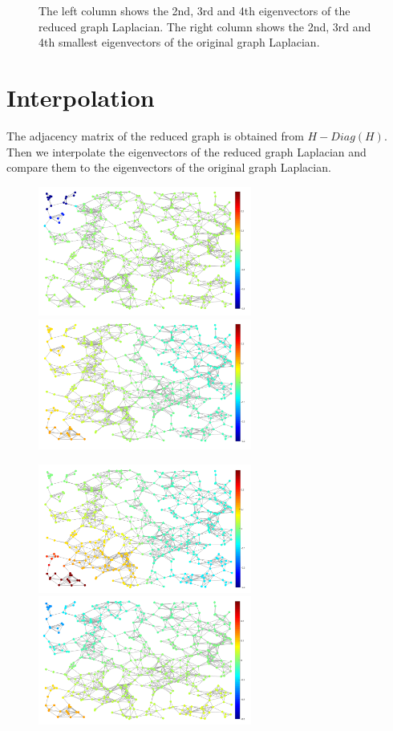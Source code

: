 \documentclass[a4paper]{article}
\begin{document}
\begin{figure}[H]
\caption{The left column shows the 2nd, 3rd and 4th eigenvectors of the reduced graph Laplacian. The right column shows the 2nd, 3rd and 4th smallest eigenvectors of the original graph Laplacian.}

\end{figure}

\section{Interpolation}

The adjacency matrix of the reduced graph is obtained from $H-Diag(H)$. Then we interpolate the eigenvectors of the reduced graph Laplacian and compare them to the eigenvectors of the original graph Laplacian.

\begin{figure}[H]
\centering
\includegraphics[width = 7cm]{interpolation/interpolate_2nd_eigen}
\includegraphics[width = 7cm]{interpolation/original_2nd_eigen}

\includegraphics[width = 7cm]{interpolation/interpolate_3rd_eigen}
\includegraphics[width = 7cm]{interpolation/original_3rd_eigen}


\end{figure}
\end{document}
